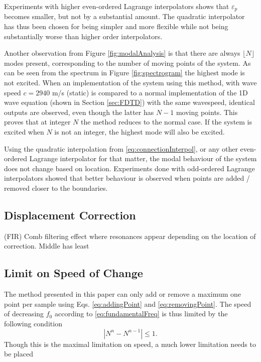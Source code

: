 Experiments with higher even-ordered Lagrange interpolators shows that $\varepsilon_p$ becomes smaller, but not by a substantial amount. The quadratic interpolator has thus been chosen for being simpler and more flexible while not being substantially worse than higher order interpolators.

Another observation from Figure \ref{fig:modalAnalysis} is that there are always $\lfloor N \rfloor$ modes present, corresponding to the number of moving points of the system. As can be seen from the spectrum in Figure \ref{fig:spectrogram} the highest mode is not excited. When an implementation of the system using this method, with wave speed $c = 2940$ m/s (static) is compared to a normal implementation of the 1D wave equation (shown in Section \ref{sec:FDTD}) with the same wavespeed, identical outputs are observed, even though the latter has $N-1$ moving points. This proves that at integer $N$ the method reduces to the normal case. If the system is excited when $N$ is not an integer, the highest mode will also be excited.

Using the quadratic interpolation from \eqref{eq:connectionInterpol}, or any other even-ordered Lagrange interpolator for that matter, the modal behaviour of the system does not change based on location. Experiments done with odd-ordered Lagrange interpolators showed that better behaviour is observed when points are added / removed closer to the boundaries. 

\subsection{Displacement Correction}\label{sec:dispCorrRes}
(FIR) Comb filtering effect where resonances appear depending on the location of correction. Middle has least

\subsection{Limit on Speed of Change}
The method presented in this paper can only add or remove a maximum one point per sample using Eqs. \eqref{eq:addingPoint} and \eqref{eq:removingPoint}. The speed of decreasing $f_0$ according to \eqref{eq:fundamentalFreq} is thus limited by the following condition
\begin{equation}\label{eq:pointCondition}
    |N^n - N^{n-1}| \leq 1. 
\end{equation}
Though this is the maximal limitation on speed, a much lower limitation needs to be placed 

